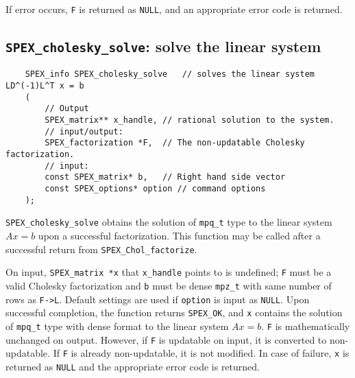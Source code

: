 \documentclass[12pt]{report}
\theoremstyle{definition}
\begin{document}
If error occurs, \verb|F| is returned as \verb|NULL|, and an appropriate error code is returned.

\subsection{\texttt{SPEX\_cholesky\_solve}: solve the linear system}
\label{ss:SPEX_Chol_solve}

\begin{mdframed}[userdefinedwidth=6in]
{\footnotesize
\begin{verbatim}
    SPEX_info SPEX_cholesky_solve   // solves the linear system LD^(-1)L^T x = b
    (
        // Output
        SPEX_matrix** x_handle, // rational solution to the system. 
        // input/output:
        SPEX_factorization *F,  // The non-updatable Cholesky factorization.
        // input:
        const SPEX_matrix* b,   // Right hand side vector
        const SPEX_options* option // command options
    );
\end{verbatim}
} \end{mdframed}

\verb|SPEX_cholesky_solve| obtains the solution of \verb|mpq_t| type to the
linear system $Ax=b$ upon a successful factorization.  This function may be
called after a successful return from \verb|SPEX_Chol_factorize|.

On input, \verb|SPEX_matrix *x| that \verb|x_handle| points to is undefined; \verb|F| must be a valid Cholesky factorization and \verb|b| must be dense \verb|mpz_t| with same number of rows as \verb|F->L|. Default settings are used if
\verb|option| is input as \verb|NULL|. Upon successful completion, the function returns \verb|SPEX_OK|, and \verb|x|
contains the solution of \verb|mpq_t| type with dense format to the linear
system $Ax=b$. \verb|F| is mathematically unchanged on output. However, if \verb|F| is updatable on input, it is converted to non-updatable. If \verb|F| is already non-updatable, it is not modified.
In case of failure, \verb|x| is returned as \verb|NULL| and the appropriate error code is returned.
\end{document}
